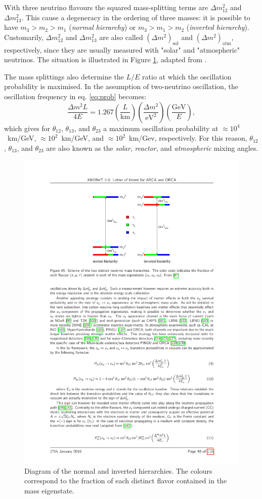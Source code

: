 With three neutrino flavours the squared mass-splitting terms are $\Delta m_{12}^2$ and $\Delta m_{13}^2$. This cause a degeneracy in the ordering of three masses: it is possible to have $m_3 > m_2 > m_1$ (\emph{normal hierarchy}) or $m_3 > m_1 > m_2$ (\emph{inverted hierarchy}). Customarily, $\Delta m_{12}^2$ and $\Delta m_{13}^2$ are also called $(\Delta m^2)_{\mathrm{sol}}$ and $(\Delta m^2)_{\mathrm{atm}}$, respectively, since they are usually measured with "solar" and "atmospheric" neutrinos. The situation is illustrated in Figure \ref{fig:masshierarchy}, adapted from \cite{Cahn:2013taa}.

The mass splittings also determine the $L/E$ ratio at which the oscillation probability is maximised. In the assumption of two-neutrino oscillation, the oscillation frequency in eq. \eqref{eq:prob} becomes:
\begin{equation}
     \frac{\Delta m^{2}L}{4E} = 1.267\left(\frac{L}{\mathrm{km}}\right)\left(\frac{\Delta m^2}{\mathrm{eV}^2}\right)\left(\frac{\mathrm{GeV}}{E}\right),
\end{equation} 
which gives for $\theta_{12}$, $\theta_{13}$, and $\theta_{23}$ a maximum oscillation probability at $\approx 10^4$~km/GeV, $\approx 10^2$~km/GeV, and $\approx 10^2$~km/Gev, respectively. For this reason, $\theta_{12}$, $\theta_{13}$, and $\theta_{23}$ are also known as the \emph{solar}, \emph{reactor}, and \emph{atmospheric} mixing angles.

\begin{figure}
    \centering
    \includegraphics[width=0.75\linewidth]{figures/masshierarchy.pdf}
    \caption{Diagram of the normal and inverted hierarchies. The colours correspond to the fraction of each distinct flavor contained in the mass eigenstate.}
    \label{fig:masshierarchy}
\end{figure}

